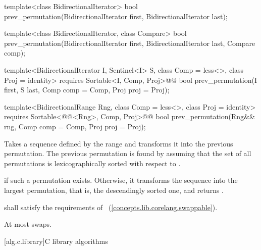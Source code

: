 %
\begin{removedblock}
\begin{itemdecl}
template<class BidirectionalIterator>
  bool prev_permutation(BidirectionalIterator first,
                        BidirectionalIterator last);

template<class BidirectionalIterator, class Compare>
  bool prev_permutation(BidirectionalIterator first,
                        BidirectionalIterator last, Compare comp);
\end{itemdecl}
\end{removedblock}
\begin{addedblock}
\begin{itemdecl}
template<BidirectionalIterator I, Sentinel<I> S, class Comp = less<>,
    class Proj = identity>
  requires Sortable<I, Comp, Proj>@\newtxt{()}@
  bool prev_permutation(I first, S last, Comp comp = Comp{}, Proj proj = Proj{});

template<BidirectionalRange Rng, class Comp = less<>,
    class Proj = identity>
  requires Sortable<@@<Rng>, Comp, Proj>@\newtxt{()}@
  bool
    prev_permutation(Rng&& rng, Comp comp = Comp{}, Proj proj = Proj{});
\end{itemdecl}
\end{addedblock}

\begin{itemdescr}
\pnum
\effects
Takes a sequence defined by the range
and transforms it into the previous permutation.
The previous permutation is found by assuming that the set of all permutations is
lexicographically sorted with respect to
 .

\pnum
\returns
{}
if such a permutation exists.
Otherwise, it transforms the sequence into the largest permutation,
that is, the descendingly sorted one, and returns
.

\begin{removedblock}
\pnum
\requires
{} shall satisfy the requirements of
~(\ref{concepts.lib.corelang.swappable}).
\end{removedblock}

\pnum
\complexity
At most
swaps.
\end{itemdescr}

[alg.c.library]{C library algorithms}


